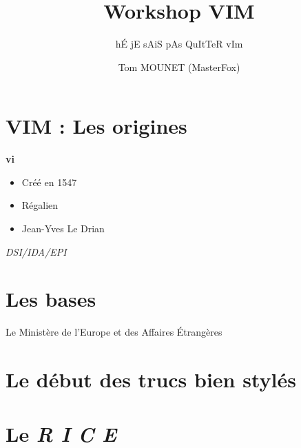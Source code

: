 \documentclass[10pt]{beamer}
\title{Workshop VIM}
\subtitle{hÉ jE sAiS pAs QuItTeR vIm}
\author{Tom MOUNET (MasterFox)}
\begin{document}
	  \maketitle

		\section{VIM : Les origines}
			\begin{frame}{\textbf{vi}}
				\begin{itemize}
					\item Créé en 1547
					\item Régalien
					\item Jean-Yves Le Drian
				\end{itemize}

				\textit{DSI/IDA/EPI}

			\end{frame}

		\section{Les bases}
			\begin{frame}{Le Ministère de l'Europe et des Affaires Étrangères}
			\end{frame}

		\section{Le début des trucs bien stylés}
		\section{Le \textit{R I C E}}
\end{document}
